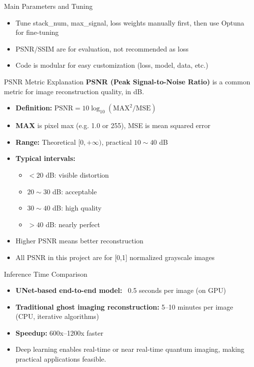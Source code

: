 \documentclass{beamer}
\begin{document}
\begin{frame}{Main Parameters and Tuning}
\begin{itemize}
    \item Tune stack\_num, max\_signal, loss weights manually first, then use Optuna for fine-tuning
    \item PSNR/SSIM are for evaluation, not recommended as loss
    \item Code is modular for easy customization (loss, model, data, etc.)
\end{itemize}
\end{frame}

\begin{frame}{PSNR Metric Explanation}
    \textbf{PSNR (Peak Signal-to-Noise Ratio)} is a common metric for image reconstruction quality, in dB.
    \begin{itemize}
        \item \textbf{Definition:} $\mathrm{PSNR} = 10 \log_{10}(\mathrm{MAX}^2 / \mathrm{MSE})$
        \item \textbf{MAX} is pixel max (e.g. 1.0 or 255), MSE is mean squared error
        \item \textbf{Range:} Theoretical $[0, +\infty)$, practical $10\sim40$ dB
        \item \textbf{Typical intervals:}
        \begin{itemize}
            \item $<20$ dB: visible distortion
            \item $20\sim30$ dB: acceptable
            \item $30\sim40$ dB: high quality
            \item $>40$ dB: nearly perfect
        \end{itemize}
        \item Higher PSNR means better reconstruction
        \item All PSNR in this project are for [0,1] normalized grayscale images
    \end{itemize}
\end{frame}

\begin{frame}{Inference Time Comparison}
\begin{itemize}
    \item \textbf{UNet-based end-to-end model:} ~0.5 seconds per image (on GPU)
    \item \textbf{Traditional ghost imaging reconstruction:} 5--10 minutes per image (CPU, iterative algorithms)
    \item \textbf{Speedup:} 600x--1200x faster
    \item Deep learning enables real-time or near real-time quantum imaging, making practical applications feasible.
\end{itemize}
\end{frame}
\end{document}
